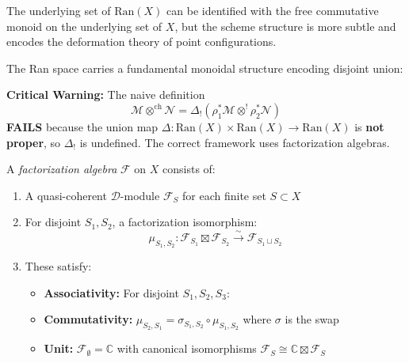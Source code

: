 \begin{remark}
The underlying set of $\text{Ran}(X)$ can be identified with the free commutative monoid on the 
underlying set of $X$, but the scheme structure is more subtle and encodes the deformation theory
of point configurations.
\end{remark}
 
The Ran space carries a fundamental monoidal structure encoding disjoint union:
 
\begin{definition}\label{def:factorization}
\textbf{Critical Warning:} The naive definition 
$$\mathcal{M} \otimes^{\text{ch}} \mathcal{N} = \Delta_! \left( \rho_1^* \mathcal{M} \otimes^! \rho_2^* \mathcal{N} \right)$$
\textbf{FAILS} because the union map $\Delta: \text{Ran}(X) \times \text{Ran}(X) \to \text{Ran}(X)$ is \textbf{not proper}, 
so $\Delta_!$ is undefined. The correct framework uses factorization algebras.
\end{definition}

\begin{definition}\label{def:fact-algebra-correct}
A \emph{factorization algebra} $\mathcal{F}$ on $X$ consists of:
\begin{enumerate}
\item A quasi-coherent $\mathcal{D}$-module $\mathcal{F}_S$ for each finite set $S \subset X$
\item For disjoint $S_1, S_2$, a factorization isomorphism:
   $$\mu_{S_1,S_2}: \mathcal{F}_{S_1} \boxtimes \mathcal{F}_{S_2} \xrightarrow{\sim} \mathcal{F}_{S_1 \sqcup S_2}$$
\item These satisfy:
   \begin{itemize}
   \item \textbf{Associativity:} For disjoint $S_1, S_2, S_3$:
   \begin{center}
   \end{center}
   \item \textbf{Commutativity:} $\mu_{S_2,S_1} = \sigma_{S_1,S_2} \circ \mu_{S_1,S_2}$ where $\sigma$ is the swap
   \item \textbf{Unit:} $\mathcal{F}_\emptyset = \mathbb{C}$ with canonical isomorphisms $\mathcal{F}_S \cong \mathbb{C} \boxtimes \mathcal{F}_S$
   \end{itemize}
\end{enumerate}
\end{definition}

